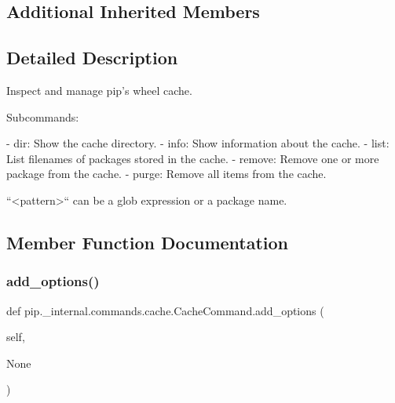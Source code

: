 \subsection*{Additional Inherited Members}


\subsection{Detailed Description}
\begin{DoxyVerb}Inspect and manage pip's wheel cache.

Subcommands:

- dir: Show the cache directory.
- info: Show information about the cache.
- list: List filenames of packages stored in the cache.
- remove: Remove one or more package from the cache.
- purge: Remove all items from the cache.

``<pattern>`` can be a glob expression or a package name.
\end{DoxyVerb}
 

\subsection{Member Function Documentation}
\mbox{\label{classpip_1_1__internal_1_1commands_1_1cache_1_1CacheCommand_a0e754ef44c08dcd4f8b45fce1341c569}} 
\subsubsection{\texorpdfstring{add\+\_\+options()}{add\_options()}}
{\footnotesize\ttfamily def pip.\+\_\+internal.\+commands.\+cache.\+Cache\+Command.\+add\+\_\+options (\begin{DoxyParamCaption}\item[{}]{self,  }\item[{}]{None }\end{DoxyParamCaption})}

\mbox{\label{classpip_1_1__internal_1_1commands_1_1cache_1_1CacheCommand_add5ea5a3cc58a66dfbdd5d82dcd177a5}} 
